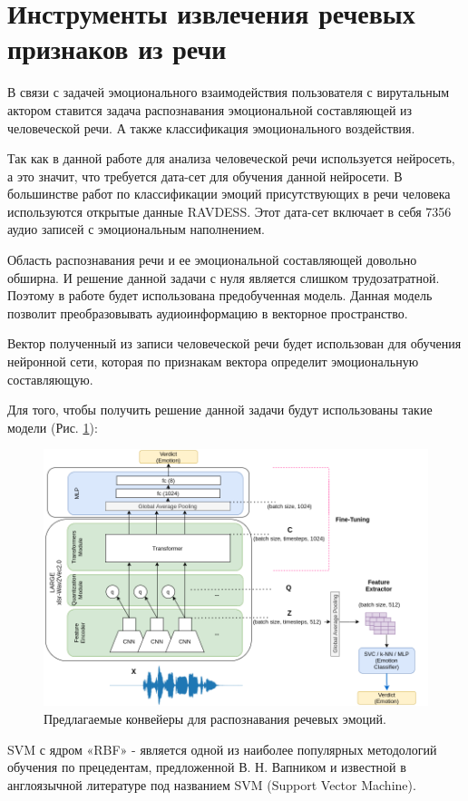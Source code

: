\section{Инструменты извлечения речевых признаков из речи}

В связи с задачей эмоционального взаимодействия пользователя с вирутальным актором
ставится задача распознавания эмоциональной составляющей из человеческой речи. А также
классификация эмоционального воздействия.

Так как в данной работе для анализа человеческой речи используется нейросеть, а это значит,
что требуется дата-сет для обучения данной нейросети.
В большинстве работ по классификации эмоций присутствующих в речи человека используются
открытые данные RAVDESS. Этот дата-сет включает в себя 7356 аудио записей с эмоциональным наполнением.

Область распознавания речи и ее эмоциональной составляющей довольно обширна. И решение данной задачи с нуля
является слишком трудозатратной. Поэтому в работе будет использована предобученная модель.
Данная модель позволит преобразовывать аудиоинформацию в векторное пространство.

Вектор полученный из записи человеческой речи будет использован для обучения нейронной сети,
которая по признакам вектора определит эмоциональную составляющую.

Для того, чтобы получить решение данной задачи будут использованы такие модели (Рис. \ref{pic:normpic}):

\begin{figure}[h]
\includegraphics[width=0.75\columnwidth]{./img/normpic.png}
\centering
\caption{Предлагаемые конвейеры для распознавания речевых эмоций.}
\label{pic:normpic}
\end{figure}


SVM с ядром «RBF» -  является одной из наиболее популярных методологий обучения по прецедентам,
предложенной В. Н. Вапником и известной в англоязычной литературе под названием SVM (Support Vector Machine).

